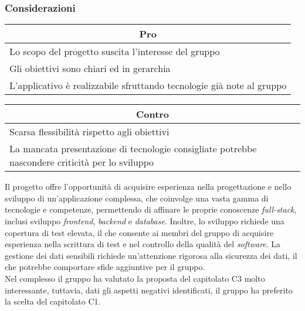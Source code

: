 \subsubsection{Considerazioni}
\begin{minipage}[t]{0.45\linewidth}
    \vspace{0pt}
    {\renewcommand{\arraystretch}{1.5}
    \begin{tabular}{p{1\linewidth}}
        \multicolumn{1}{c}{\textbf{Pro}} \\
        \midrule
        Lo scopo del progetto suscita l'interesse del gruppo \\
        Gli obiettivi sono chiari ed in gerarchia \\
        L'applicativo è realizzabile sfruttando tecnologie già note al gruppo \\
        \hline
    \end{tabular}
    }
\end{minipage}
\hspace{0.05\linewidth}
\begin{minipage}[t]{0.45\linewidth}
    \vspace{0pt}
    {\renewcommand{\arraystretch}{1.5}
    \begin{tabular}{p{1\linewidth}}
        \multicolumn{1}{c}{\textbf{Contro}} \\
        \midrule
        Scarsa flessibilità rispetto agli obiettivi \\
        La mancata presentazione di tecnologie consigliate potrebbe nascondere criticità per lo sviluppo\\
        \hline
    \end{tabular}
    }
\end{minipage}
\vspace{1em}

\noindent
Il progetto offre l'opportunità di acquisire esperienza nella progettazione e nello sviluppo di un'applicazione complessa, che coinvolge una vasta gamma di tecnologie e competenze, permettendo di affinare le proprie conoscenze \textit{full-stack}, inclusi sviluppo \textit{frontend}, \textit{backend} e \textit{database}.
Inoltre, lo sviluppo richiede una copertura di test elevata, il che consente ai membri del gruppo di acquisire esperienza nella scrittura di test e nel controllo della qualità del \textit{software}.
La gestione dei dati sensibili richiede un'attenzione rigorosa alla sicurezza dei dati, il che potrebbe comportare sfide aggiuntive per il gruppo.\\
Nel complesso il gruppo ha valutato la proposta del capitolato C3 molto interessante, tuttavia, dati gli aspetti negativi identificati, il gruppo ha preferito la scelta del capitolato C1.

